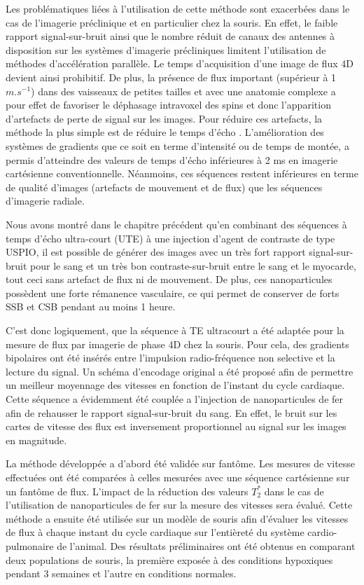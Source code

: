 Les problématiques liées à l'utilisation de cette méthode sont exacerbées dans le cas de l'imagerie préclinique et en particulier chez la souris. En effet, le faible rapport signal-sur-bruit ainsi que le nombre réduit de canaux des antennes à disposition sur les systèmes d'imagerie précliniques limitent l'utilisation de méthodes d'accélération parallèle. Le temps d'acquisition d'une image de flux 4D devient ainsi prohibitif. De plus, la présence de flux important (supérieur à 1 $m.s^{-1}$) dans des vaisseaux de petites tailles et avec une anatomie complexe a pour effet de favoriser le déphasage intravoxel des spins et donc l'apparition d'artefacts de perte de signal sur les images. Pour réduire ces artefacts, la méthode la plus simple est de réduire le temps d'écho \cite{staahlberg1994pulse,OBrien:2008aa}. L'amélioration des systèmes de gradients que ce soit en terme d'intensité ou de temps de montée, a permis d'atteindre des valeurs de temps d'écho inférieures à 2 ms en imagerie cartésienne conventionnelle. Néanmoins, ces séquences restent inférieures en terme de qualité d'images (artefacts de mouvement et de flux) que les séquences d'imagerie radiale.

Nous avons montré dans le chapitre précédent qu’en combinant des séquences à temps d’écho ultra-court (UTE) à une injection d’agent de contraste de type USPIO, il est possible de générer des images avec un très fort rapport signal-sur-bruit pour le sang et un très bon contraste-sur-bruit entre le sang et le myocarde, tout ceci sans artefact de flux ni de mouvement. De plus, ces nanoparticules possèdent une forte rémanence vasculaire, ce qui permet de conserver de forts SSB et CSB pendant au moins 1 heure.

C’est donc logiquement, que la séquence à TE ultracourt a été adaptée pour la mesure de flux par imagerie de phase 4D chez la souris. Pour cela, des gradients bipolaires ont été insérés entre l’impulsion radio-fréquence non selective et la lecture du signal. Un schéma d’encodage original a été proposé afin de permettre un meilleur moyennage des vitesses en fonction de l’instant du cycle cardiaque. 
Cette séquence a évidemment été couplée a l’injection de nanoparticules de fer afin de rehausser le rapport signal-sur-bruit du sang. En effet, le bruit sur les cartes de vitesse des flux est inversement proportionnel au signal sur les images en magnitude.

La méthode développée a d’abord été validée sur fantôme. Les mesures de vitesse effectuées ont été comparées à celles mesurées avec une séquence cartésienne sur un fantôme de flux. L’impact de la réduction des valeurs $T_2^*$ dans le cas de l’utilisation de nanoparticules de fer sur la mesure des vitesses sera évalué. Cette méthode a ensuite été utilisée sur un modèle de souris afin d’évaluer les vitesses de flux à chaque instant du cycle cardiaque sur l’entièreté du système cardio-pulmonaire de l’animal. Des résultats préliminaires ont été obtenus en comparant deux populations de souris, la première exposée à des conditions hypoxiques pendant 3 semaines et l’autre en conditions normales.

